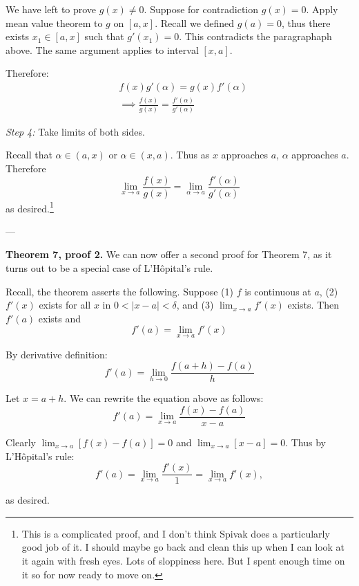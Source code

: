 \vs

We have left to prove $g(x)\neq0$. Suppose for contradiction $g(x)=0$.
Apply mean value theorem to $g$ on $[a,x]$. Recall we defined
$g(a)=0$, thus there exists $x_1\in[a,x]$ such that $g'(x_1)=0$. This
contradicts the paragraphaph above. The same argument applies to
interval $[x,a]$.

\vs

Therefore:
\begin{align*}
  &f(x)g'(\alpha)=g(x)f'(\alpha)\\
  &\implies \frac{f(x)}{g(x)}=\frac{f'(\alpha)}{g'(\alpha)}
\end{align*}


\textit{Step 4:} Take limits of both sides.

\vs

Recall that $\alpha\in(a,x)$ or $\alpha\in(x,a)$. Thus as $x$ approaches $a$, $\alpha$
approaches $a$. Therefore
\[\lim_{x\to a}\frac{f(x)}{g(x)}=\lim_{\alpha\to a}\frac{f'(\alpha)}{g'(\alpha)}\]
as desired.\footnote{This is a complicated proof, and I don't think
  Spivak does a particularly good job of it. I should maybe go back
  and clean this up when I can look at it again with fresh eyes. Lots
  of sloppiness here. But I spent enough time on it so for now ready
  to move on.}

\vs---\vs

\textbf{Theorem 7, proof 2.} We can now offer a second proof for
Theorem 7, as it turns out to be a special case of L'H\^opital's rule.

\vs

Recall, the theorem asserts the following. Suppose (1) $f$ is
continuous at $a$, (2) $f'(x)$ exists for all $x$ in $0<|x-a|<\delta$, and
(3) $\lim_{x\to a}f'(x)$ exists. Then $f'(a)$ exists and
\[f'(a)=\lim_{x\to a}f'(x)\]

\vs

By derivative definition:
\[f'(a)=\lim_{h\to0}\frac{f(a+h)-f(a)}{h}\]

Let $x=a+h$. We can rewrite the equation above as follows:
\[f'(a)=\lim_{x\to a}\frac{f(x)-f(a)}{x-a}\]

Clearly $\lim_{x\to a}[f(x)-f(a)]=0$ and $\lim_{x\to a}[x-a]=0$. Thus by
L'H\^opital's rule:
\[f'(a)=\lim_{x\to a}\frac{f'(x)}{1}=\lim_{x\to a}f'(x),\]

as desired.


